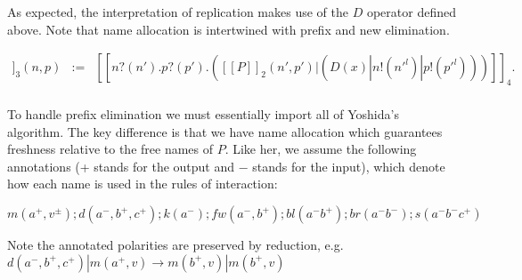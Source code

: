 \documentclass{llncs}
\newcommand{\ldb}{[\![}
\newcommand{\rdb}{]\!]}
\newcommand{\binpar}[2]{#1 | #2}
\newcommand{\outputp}[2]{#1!(#2)}
\newcommand{\prefix}[3]{#1?(#2) . #3}
\newcommand{\meaningof}[1]{\ldb #1 \rdb}
\begin{document}
As expected, the interpretation of replication makes use of the $D$
operator defined above. Note that name allocation is intertwined with
prefix and new elimination.
         
\begin{eqnarray*}
  \meaningof{P}_3(n, p) 
    & := & 
      \meaningof{\prefix{n}{n'}{\prefix{p}{p'}{(\binpar{\meaningof{P}_2(n',p')}
        {(\binpar{D(x)}{\binpar{\outputp{n}{n'^l}}{\outputp{p}{p'^l}}})})}}}_4. \\
\end{eqnarray*}

To handle prefix elimination we must essentially import all of
Yoshida's algorithm. The key difference is that we have name
allocation which guarantees freshness relative to the free names of
$P$. Like her, we assume the following annotations (+ stands for the
output and − stands for the input), which denote how each name is used
in the rules of interaction:

$m(a^{+},v^{\pm});d(a^{−},b^{+},c^{+});k(a^{−});fw(a^{−},b^{+});bl(a^{−}b^{+});br(a^{−}b^{−});s(a^{−}b^{−}c^{+})$

Note the annotated polarities are preserved by reduction, e.g.
$d(a^{−},b^{+},c^{+}) | m(a^{+},v) \to m(b^{+},v) | m(b^{+},v)$
\end{document}
